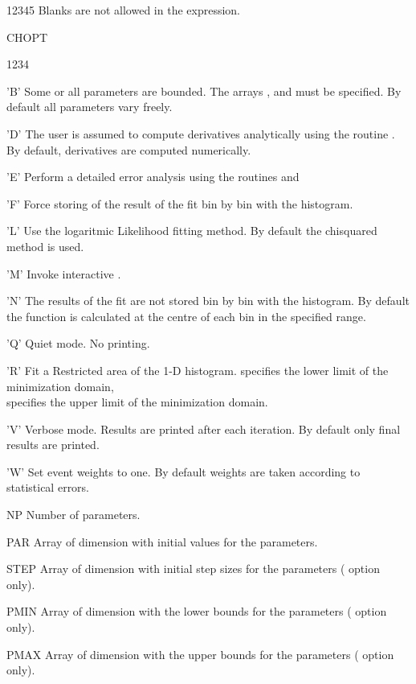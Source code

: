 \begin{DLtt}{12345}
      Blanks are not allowed in the expression.
\item[CHOPT] 
\begin{DLtt}{1234}
\item['B'] Some or all parameters are bounded.
           The arrays ,  and 
           must be specified.
           By default all parameters vary freely.
\item['D'] The user is assumed to compute derivatives analytically
           using the routine .
           By default, derivatives are computed numerically.
\item['E'] Perform a detailed error analysis using the \MINUIT{} routines
            and 
\item['F'] Force storing of the result of the fit bin by bin with the
           histogram.
\item['L'] Use the logaritmic Likelihood fitting method.
           By default the chisquared method is used.
\item['M'] Invoke interactive \MINUIT.
\item['N'] The results of the fit are not stored
           bin by bin with the histogram.
           By default the function is calculated at the centre of each bin
           in the specified range.
\item['Q'] Quiet mode. No printing.
\item['R'] Fit a Restricted area of the 1-D histogram.
            specifies the lower limit of the minimization domain,\\
            specifies the upper limit of the minimization domain.
\item['V'] Verbose mode.
           Results are printed after each iteration.
           By default only final results are printed.
\item['W'] Set event weights to one.
           By default weights are taken according to statistical errors.
\end{DLtt}
\item[NP] Number of parameters.
\item[PAR] Array of dimension  with initial values for
      the parameters.
\item[STEP] Array of dimension  with initial step sizes
      for the parameters ( option only).
\item[PMIN] Array of dimension  with the lower bounds
      for the parameters ( option only).
\item[PMAX] Array of dimension  with the upper bounds
      for the parameters ( option only).


\end{DLtt}
